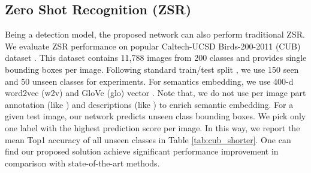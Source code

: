 \documentclass[runningheads]{llncs}
\begin{document}
\begin{SCtable}[60][!t]
\caption{Zero shot recognition on CUB using  because no meta-class assignment is done here. For fairness, we only compared our result with the inductive setting of other methods without per image part annotation and description. We refer V=VGG, R=ResNet, G=GoogLeNet.
}
  \label{tab:cub_shorter}
\end{SCtable}

\subsection{Zero Shot Recognition (ZSR)}
    Being a detection model, the proposed network can also perform traditional ZSR. We evaluate ZSR performance on popular Caltech-UCSD Birds-200-2011 (CUB) dataset \cite{CUB_2011}. This dataset contains 11,788 images from 200 classes and provides single bounding boxes per image. Following standard train/test split \cite{Xian_CVPR_2017}, we use 150 seen and 50 unseen classes for experiments. For semantics embedding, we use 400-d word2vec (w2v) and GloVe (glo) vector \cite{Xian_2016_CVPR}. Note that, we do not use per image part annotation (like \cite{Akata_2016_CVPR}) and descriptions (like \cite{Zhang_2017_CVPR}) to enrich semantic embedding. For a given test image, our network predicts unseen class bounding boxes. We pick only one label with the highest prediction score per image. In this way, we report the mean Top1 accuracy of all unseen classes in Table \ref{tab:cub_shorter}. One can find our proposed solution achieve significant performance improvement in comparison with state-of-the-art methods.
\end{document}
